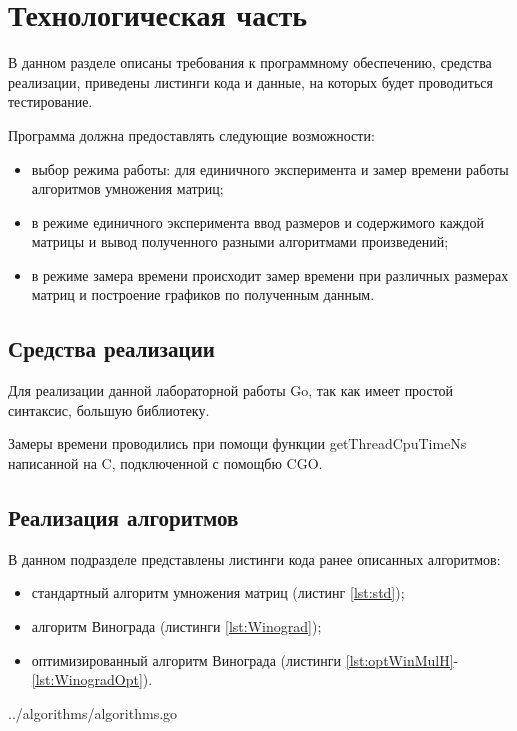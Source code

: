 \chapter{Технологическая часть}

В данном разделе описаны требования к программному обеспечению, средства
реализации, приведены листинги кода и данные, на которых будет проводиться
тестирование.

Программа должна предоставлять следующие возможности:
\begin{itemize}[left=\parindent]
    \item выбор режима работы: для единичного эксперимента и замер времени работы алгоритмов умножения матриц;
    \item в режиме единичного эксперимента ввод размеров и содержимого каждой
          матрицы и вывод полученного разными алгоритмами произведений;
    \item в режиме замера времени происходит замер времени при различных
          размерах матриц и построение графиков по полученным данным.
\end{itemize}

\section{Средства реализации}

Для реализации данной лабораторной работы Go, так как имеет простой синтаксис, 
большую библиотеку.

Замеры времени проводились при помощи функции getThreadCpuTimeNs написанной на C, 
подключенной с помощбю CGO.

\section{Реализация алгоритмов}

В данном подразделе представлены листинги кода ранее описанных алгоритмов:
\begin{itemize}[left=\parindent]
    \item стандартный алгоритм умножения матриц (листинг \ref{lst:std});
    \item алгоритм Винограда (листинги \ref{lst:Winograd});
    \item оптимизированный алгоритм Винограда (листинги
          \ref{lst:optWinMulH}-\ref{lst:WinogradOpt}).
\end{itemize}

\noindent
\begin{minipage}{\linewidth}
\begin{lstinputlisting}[
	caption={Реализация стандартного алгоритма умножения матриц},
	label={lst:std},
	linerange={94-106}
]{../algorithms/algorithms.go}
\end{lstinputlisting}
\end{minipage}

